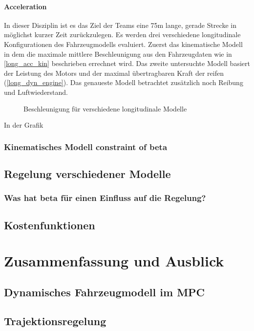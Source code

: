 \documentclass{like}
\begin{document}
\subsubsection*{Acceleration}
In dieser Disziplin ist es das Ziel der Teams eine 75m lange, gerade Strecke in möglichst kurzer Zeit zurückzulegen.
Es werden drei verschiedene longitudinale Konfigurationen des Fahrzeugmodells evaluiert. Zuerst das kinematische Modell in dem die maximale mittlere Beschleunigung aus den Fahrzeugdaten wie in \ref{long_acc_kin} beschrieben errechnet wird. Das zweite untersuchte Modell basiert der Leistung des Motors und der maximal übertragbaren Kraft der reifen (\ref{long_dyn_engine}).
Das genaueste Modell betrachtet zusätzlich noch Reibung und Luftwiederstand. 


\begin{figure}
	\centering
	 
	\caption{Beschleunigung für verschiedene longitudinale Modelle}
	\label{fig:accdec}
\end{figure}

In der Grafik 

\subsection{Kinematisches Modell constraint of beta}
\section{Regelung verschiedener Modelle}
\subsection{Was hat beta für einen Einfluss auf die Regelung?}
\section{Kostenfunktionen}



\chapter[Ausblick]{Zusammenfassung und Ausblick}
\section{Dynamisches Fahrzeugmodell im MPC}
\section{Trajektionsregelung}
\end{document}
